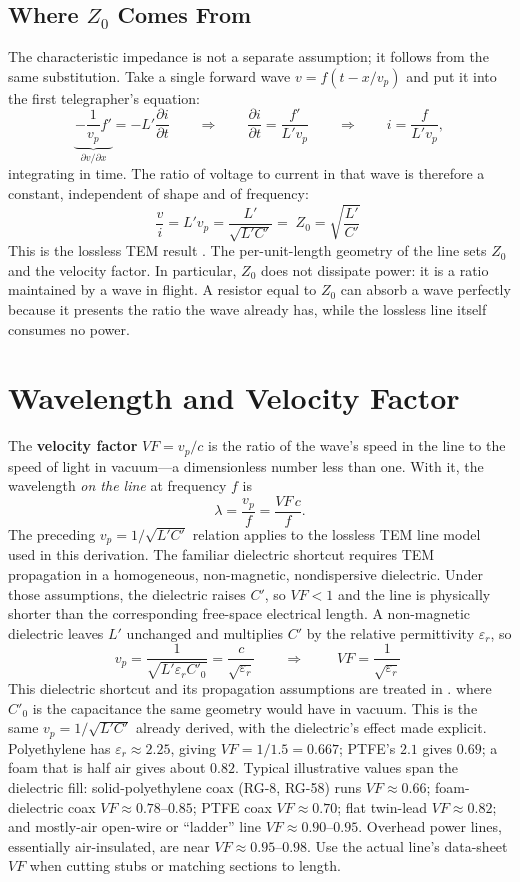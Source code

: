 \subsection{Where \texorpdfstring{\(Z_0\)}{Z0} Comes From}
The characteristic impedance is not a separate assumption; it follows from the same
substitution. Take a single forward wave \(v=f(t-x/v_p)\) and put it into the first
telegrapher's equation:
\[
\underbrace{-\frac{1}{v_p}f'}_{\partial v/\partial x}
=-L'\frac{\partial i}{\partial t}
\qquad\Longrightarrow\qquad
\frac{\partial i}{\partial t}=\frac{f'}{L'v_p}
\qquad\Longrightarrow\qquad
i=\frac{f}{L'v_p},
\]
integrating in time. The ratio of voltage to current in that wave is therefore a
constant, independent of shape and of frequency:
\[
\frac{v}{i}=L'v_p=\frac{L'}{\sqrt{L'C'}}
=\boxed{\;Z_0=\sqrt{\frac{L'}{C'}}\;}
\]
This is the lossless TEM result \cite[pp.~67--72]{davis2011rfcircuit}.
The per-unit-length geometry of the line sets \(Z_0\) and the velocity factor. In
particular, \(Z_0\) does not dissipate power: it is a ratio maintained by a wave in
flight. A resistor equal to \(Z_0\) can absorb a wave perfectly because it presents
the ratio the wave already has, while the lossless line itself consumes no power.

\section{Wavelength and Velocity Factor}
The \textbf{velocity factor} \(VF=v_p/c\) is the ratio of the wave's speed in the
line to the speed of light in vacuum---a dimensionless number less than one. With it,
the wavelength \emph{on the line} at frequency \(f\) is
\[
\lambda=\frac{v_p}{f}=\frac{VF\,c}{f}.
\]
The preceding \(v_p=1/\sqrt{L'C'}\) relation applies to the lossless TEM line model
used in this derivation. The familiar dielectric shortcut requires TEM propagation
in a homogeneous, non-magnetic, nondispersive dielectric. Under those assumptions,
the dielectric raises \(C'\), so \(VF<1\) and the line is physically shorter than the
corresponding free-space electrical length. A non-magnetic dielectric leaves \(L'\)
unchanged and multiplies \(C'\) by the relative permittivity \(\varepsilon_r\), so
\[
v_p=\frac{1}{\sqrt{L'\varepsilon_rC'_0}}=\frac{c}{\sqrt{\varepsilon_r}}
\qquad\Longrightarrow\qquad
\boxed{\;VF=\frac{1}{\sqrt{\varepsilon_r}}\;}
\]
This dielectric shortcut and its propagation assumptions are treated in
\cite[pp.~1--8]{free2022rfmicrowave}.
where \(C'_0\) is the capacitance the same geometry would have in vacuum. This is the
same \(v_p=1/\sqrt{L'C'}\) already derived, with the dielectric's effect made
explicit.
Polyethylene has \(\varepsilon_r\approx2.25\), giving \(VF=1/1.5=0.667\); PTFE's
\(2.1\) gives \(0.69\); a foam that is half air gives about \(0.82\). Typical
illustrative values span the dielectric fill: solid-polyethylene coax (RG-8, RG-58)
runs \(VF\approx0.66\); foam-dielectric coax
\(VF\approx0.78\text{--}0.85\); PTFE coax \(VF\approx0.70\); flat twin-lead
\(VF\approx0.82\); and mostly-air open-wire or ``ladder'' line
\(VF\approx0.90\text{--}0.95\). Overhead power lines, essentially air-insulated,
are near \(VF\approx0.95\text{--}0.98\). Use the actual line's data-sheet \(VF\)
when cutting stubs or matching sections to length.

